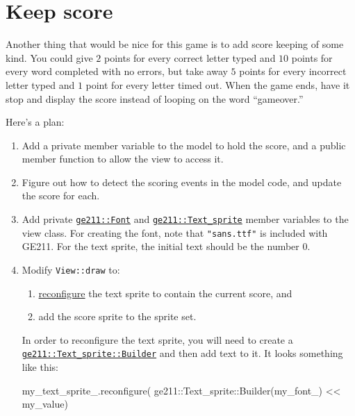 \documentclass{tufte-handout}
\begin{document}
\section{Keep score}

Another thing that would be nice for this game is to add score keeping
of some kind. You could give $2$ points for every correct letter typed
and $10$ points for every word completed with no errors, but take away
$5$ points for every incorrect letter typed and $1$ point for every
letter timed out. When the game ends, have it stop and display the score
instead of looping on the word ``gameover.''

Here's a plan:

\begin{enumerate}
  \item Add a private member variable to the model to hold the score,
    and a public member function to allow the view to access it.

  \item Figure out how to detect the scoring events in the model code,
    and update the score for each.

  \item Add private
    \href{https://tov.github.io/ge211/classge211_1_1_font.html}{\texttt{ge211::Font}}
    and
    \href{https://tov.github.io/ge211/classge211_1_1sprites_1_1_text__sprite.html}{\texttt{ge211::Text_sprite}}
    member variables to the view class. For creating the font, note that
    \texttt{"sans.ttf"} is included with GE211. For the text sprite, the
    initial text should be the number 0.

  \item Modify \texttt{View::draw} to:
    \begin{enumerate}
      \item
        \href{https://bit.ly/2SZr7N0}{reconfigure}
        the text sprite to contain the current score, and
      \item add the score sprite to the sprite set.
    \end{enumerate}
    In order to reconfigure the text sprite, you will need to create
    a
    \href{https://tov.github.io/ge211/classge211_1_1sprites_1_1_text__sprite_1_1_builder.html}{\texttt{ge211::Text_sprite::Builder}}
    and then add text to it. It looks something like this:
\begin{Code}
my_text_sprite_.reconfigure(
    ge211::Text_sprite::Builder(my_font_) << my_value)
\end{Code}
\end{enumerate}
\end{document}

